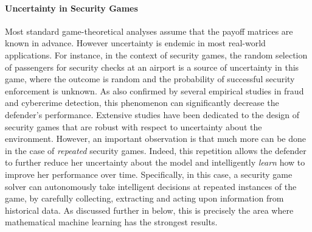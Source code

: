 
\paragraph{Uncertainty in Security Games}
Most standard game-theoretical analyses assume that the payoff matrices are known in advance.  However uncertainty is endemic in most real-world applications. 
For instance, in the context of security games, the random selection of passengers for security checks at an airport is a source of uncertainty in this game, where the outcome is random and the probability of successful security enforcement  is unknown. 
As also confirmed by several empirical studies in fraud and cybercrime detection, this phenomenon can significantly decrease the defender's performance\cite{granick2005faking, swire2009no}.
Extensive studies have been dedicated to the design of security games that are robust with respect to uncertainty about the environment\cite{aghassi2006robust,Nguyen14RO, Kiekintveld:2013}. 
However, an important observation is that much more can be done in the case of {\em repeated} security games.  
Indeed, this repetition allows the defender to further reduce her uncertainty about the model and intelligently {\em learn} how to improve her performance over time. Specifically, in this case, a security game solver can autonomously take intelligent decisions at repeated instances of the game, by carefully collecting, extracting and acting upon information from historical data. As discussed further in below, this is precisely the area where mathematical machine learning has the strongest results.

